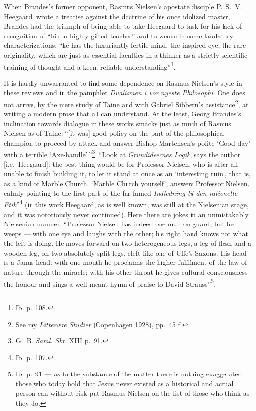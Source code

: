 \documentclass[12pt,a4paper,openany]{book}
\newcommand{\opage}[1]{\marginnote{\footnotesize\textit{[#1]}}}
\begin{document}
When Brandes's former opponent, Rasmus Nielsen's apostate disciple P.~S.~V. Heegaard, wrote a treatise against the
doctrine of his once idolized master, Brandes had the triumph of being able to take Heegaard to task for his lack
of recognition of ``his so highly gifted teacher'' and to weave in some laudatory characterizations: ``he has the
luxuriantly fertile mind, the inspired eye, the rare originality, which are just as essential faculties in a
\opage{151}\setcounter{footnote}{0}%
thinker as a strictly scientific training of thought and a keen, reliable understanding''\footnote{Ib. p.~108.}.

It is hardly unwarranted to find some dependence on Rasmus Nielsen's style in these reviews and in the pamphlet
\textit{Dualismen i vor nyeste Philosophi}. %
One does not arrive, by the mere study of Taine and with Gabriel Sibbern's assistance\footnote{See my
\textit{Litterære Studier} (Copenhagen 1928), pp.~45 f.}, at writing a modern prose that all can understand. At
the least, Georg Brandes's inclination towards dialogue in these works smacks just as much of Rasmus Nielsen as of
Taine: ``[it was] good policy on the part of the philosophical champion to proceed by attack and answer Bishop
Martensen's polite `Good day' with a terrible `Axe-handle'\,''\footnote{G.~B. \textit{Saml. Skr.} XIII p.~91.}.
``Look at \textit{Grundideernes Logik}, says the author [i.e.\ Heegaard]: the best thing would be for Professor
Nielsen, who is after all unable to finish building it, to let it stand at once as an `interesting ruin', that is,
as a kind of Marble Church. `Marble Church yourself', answers Professor Nielsen, calmly pointing to the first part
of the far-famed \textit{Indledning til den rationelle Etik}''\footnote{Ib. p.~107.} (in this work Heegaard, as is
well known, was still at the Nielsenian stage, and it was notoriously never continued). Here there are jokes in an
unmistakably Nielsenian manner: ``Professor Nielsen has indeed one man on guard, but he weeps --- with one eye and
laughs with the other; his right hand knows not what the left is doing. He moves forward on two heterogeneous legs,
a leg of flesh and a wooden leg, on two absolutely split legs, cleft like one of Uffe's Saxons. His head is a
Janus head: with one mouth he proclaims the higher fulfilment of the law of nature through the miracle; with his
other throat he gives cultural consciousness the honour and sings a well-meant hymn of praise to David
Strauss''\footnote{Ib. p.~91 --- as to the substance of the matter there is nothing exaggerated: those who today
hold that Jesus never existed as a historical and actual person can without risk put Rasmus Nielsen on the list of
those who think as they do.}.
\end{document}
